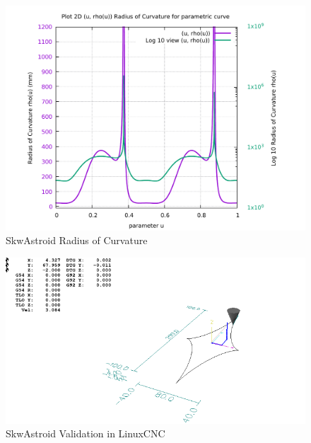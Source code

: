 \begin{figure}
	\caption     {SkwAstroid Radius of Curvature}
	\label{02-img-SkwAstroid Radius of Curvature.pdf}
	\includegraphics[width=1.00\textwidth]{Chap4/appendix/app-SkwAstroid/plots/02-img-SkwAstroid Radius of Curvature.pdf} 
\end{figure}	


\clearpage
\pagebreak

\begin{figure}
	\caption     {SkwAstroid Validation in LinuxCNC}
	\label{03-img-SkwAstroid-Validation-in-LinuxCNC.png}
	\includegraphics[width=1.00\textwidth]{Chap4/appendix/app-SkwAstroid/plots/03-img-SkwAstroid-Validation-in-LinuxCNC.png}
\end{figure}


